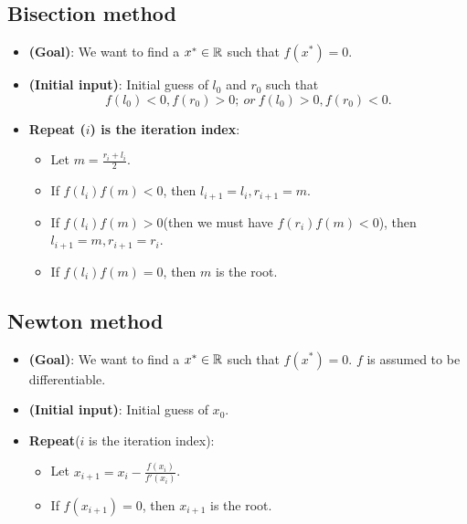 \begin{refsection}
\subsection{Bisection method}

\begin{definition}\hfill
\begin{itemize}
	\item \textbf{(Goal)}: We want to find a $x^*\in \mathbb{R}$ such that $f(x^*) = 0$.
	\item \textbf{(Initial input)}: Initial guess of $l_0$ and $r_0$ such that 
	$$f(l_0) < 0, f(r_0) > 0; ~or~ f(l_0) > 0, f(r_0) < 0.$$
	\item \textbf{Repeat ($i$) is the iteration index}: 
	\begin{itemize}
		\item Let $m = \frac{r_i + l_i}{2}$.
		\item If $f(l_i)f(m) < 0$, then $l_{i+1} = l_i, r_{i+1} = m$.
		\item If $f(l_i)f(m) > 0$(then we must have $f(r_i)f(m)<0$), then $l_{i+1} = m, r_{i+1} = r_i$.
		\item If $f(l_i)f(m) = 0$, then $m$ is the root.
	\end{itemize}
\end{itemize}	
	
\end{definition}


 \subsection{Newton method}
 
 \begin{definition}\hfill
 	\begin{itemize}
 		\item \textbf{(Goal)}: We want to find a $x^*\in \mathbb{R}$ such that $f(x^*) = 0$. $f$ is assumed to be differentiable.
 		\item \textbf{(Initial input)}: Initial guess of $x_0$.
 		\item \textbf{Repeat}($i$ is the iteration index): 
 		\begin{itemize}
 			\item Let $x_{i+1} = x_i - \frac{f(x_i)}{f'(x_i)}$.
 			\item If $f(x_{i+1}) = 0$, then $x_{i+1}$ is the root.
 		\end{itemize}
 	\end{itemize}	
 \end{definition}
 

\end{refsection}
